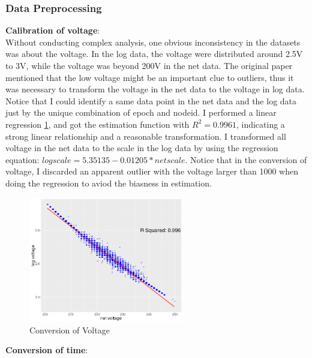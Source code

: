 \documentclass[11pt]{article}
\begin{document}
{\subsubsection{Data Preprocessing}
\textbf{Calibration of voltage}:\\
Without conducting complex analysis, one obvious inconsistency in the datasets was about the voltage. In the log data, the voltage were distributed around 2.5V to 3V, while the voltage was beyond 200V in the net data. The original paper mentioned that the low voltage might be an important clue to outliers, thus it was necessary to transform the voltage in the net data to the voltage in log data. Notice that I could identify a same data point in the net data and the log data just by the unique combination of epoch and nodeid. I performed a linear regression \ref{fig:Conv_vol}, and got the estimation function with $R^2=0.9961$, indicating a strong linear relationship and a reasonable transformation. I transformed all voltage in the net data to the scale in the log data by using the regression equation: $logscale=5.35135-0.01205*netscale$. Notice that in the conversion of voltage, I discarded an apparent outlier with the voltage larger than 1000 when doing the regression to aviod the biasness in estimation.
\begin{figure}[H]
\centering
\includegraphics [height = 155pt]{scatter_voltage.png}
\caption{Conversion of Voltage}
\label{fig:Conv_vol}
\end{figure}
\textbf{Conversion of time}:\\
}
\end{document}
